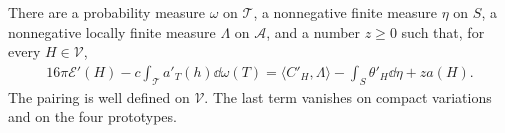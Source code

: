 \begin{lemma}
\label{n3:variation:separation}
There are a probability measure $\omega$ on $\mathcal T$, a
nonnegative finite measure $\eta$ on $S$, a nonnegative locally finite
measure $\Lambda$ on $\mathcal A$, and a number $z\ge0$ such that,
for every $H\in\mathcal V$,
\begin{equation}
 \begin{split}
 16\pi\mathcal E'(H)
   -c\int_{\mathcal T} a'_T(h)\dd\omega(T)
  =\langle C'_H,\Lambda\rangle
       -\int_S\theta'_H\dd\eta+z a(H).
 \end{split}
 \label{n3:variation:multiplier-identity}
\end{equation}
The pairing is well defined on $\mathcal V$.  The last term vanishes
on compact variations and on the four prototypes.
\end{lemma}

